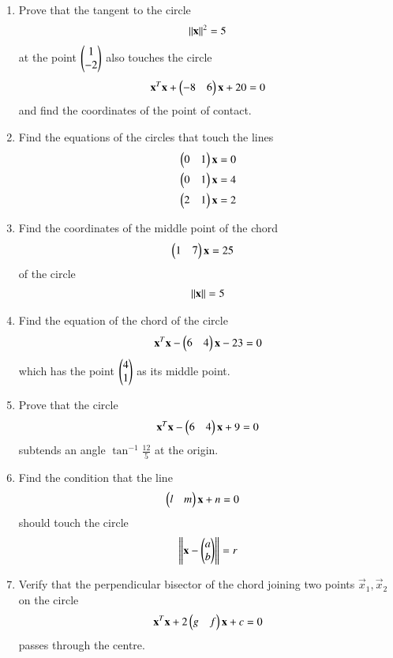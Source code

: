 \begin{enumerate}[label=\arabic*.,ref=\thesubsection.\theenumi]
\item Prove that the tangent to the circle 
\begin{align}
\left\lVert\mathbf{x}\right\rVert^2=5
\end{align}
at the point $\begin{pmatrix}1\\-2\end{pmatrix}$ also touches the circle
\begin{align}
\mathbf{x}^T\mathbf{x}+\begin{pmatrix}-8 & 6\end{pmatrix}\mathbf{x}+20 = 0
\end{align}
and find the coordinates of the point of contact.
\item Find the equations of the circles that touch the lines
\begin{align}
\begin{pmatrix}0 & 1\end{pmatrix}\mathbf{x} &= 0
\\
\begin{pmatrix}0 & 1\end{pmatrix}\mathbf{x} &= 4
\\
\begin{pmatrix}2 & 1\end{pmatrix}\mathbf{x} &= 2
\end{align}
\item Find the coordinates of the middle point of the chord
\begin{align}
\begin{pmatrix}1 & 7\end{pmatrix}\mathbf{x} &= 25
\end{align}
of the circle
\begin{align}
\left\lVert\mathbf{x}\right\rVert=5
\end{align}
\renewcommand{\theequation}{\theenumi}
\item Find the equation of the chord of the circle
\begin{align}
\mathbf{x}^T\mathbf{x}-\begin{pmatrix}6 & 4\end{pmatrix}\mathbf{x}-23 = 0
\end{align}
which has the point $\begin{pmatrix}4\\1\end{pmatrix}$ as its middle point.
\item Prove that the circle
\begin{align}
\mathbf{x}^T\mathbf{x}-\begin{pmatrix}6 & 4\end{pmatrix}\mathbf{x}+9 = 0
\end{align}
subtends an angle $\tan^{-1}\frac{12}{5}$ at the origin.
\item Find the condition that the line
\begin{align}
\begin{pmatrix}l & m\end{pmatrix}\mathbf{x} + n &= 0
\end{align}
should touch the circle
\begin{align}
\left\lVert\mathbf{x}-\begin{pmatrix}a\\b\end{pmatrix}\right\rVert=r
\end{align}
\renewcommand{\theequation}{\theenumi}
\item Verify that the perpendicular bisector of the chord joining two points $\vec{x}_1, \vec{x}_2$ on the circle
\begin{align}
\mathbf{x}^T\mathbf{x}+2\begin{pmatrix}g & f\end{pmatrix}\mathbf{x} + c = 0
\end{align}
passes through the centre.
\end{enumerate}
